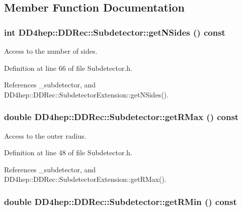\subsection{Member Function Documentation}
\hypertarget{class_d_d4hep_1_1_d_d_rec_1_1_subdetector_ad35bc9e9e55f13b1f8dec7bc47941504}{
\subsubsection[{getNSides}]{\setlength{\rightskip}{0pt plus 5cm}int DD4hep::DDRec::Subdetector::getNSides () const}}
\label{class_d_d4hep_1_1_d_d_rec_1_1_subdetector_ad35bc9e9e55f13b1f8dec7bc47941504}


Access to the number of sides. 

Definition at line 66 of file Subdetector.h.

References \_\-subdetector, and DD4hep::DDRec::SubdetectorExtension::getNSides().\hypertarget{class_d_d4hep_1_1_d_d_rec_1_1_subdetector_af2a472c02de98a252a5357288cec8839}{
\subsubsection[{getRMax}]{\setlength{\rightskip}{0pt plus 5cm}double DD4hep::DDRec::Subdetector::getRMax () const}}
\label{class_d_d4hep_1_1_d_d_rec_1_1_subdetector_af2a472c02de98a252a5357288cec8839}


Access to the outer radius. 

Definition at line 48 of file Subdetector.h.

References \_\-subdetector, and DD4hep::DDRec::SubdetectorExtension::getRMax().\hypertarget{class_d_d4hep_1_1_d_d_rec_1_1_subdetector_a9ab6536e68cb4706ae4f75640d486849}{
\subsubsection[{getRMin}]{\setlength{\rightskip}{0pt plus 5cm}double DD4hep::DDRec::Subdetector::getRMin () const}}
\label{class_d_d4hep_1_1_d_d_rec_1_1_subdetector_a9ab6536e68cb4706ae4f75640d486849}


